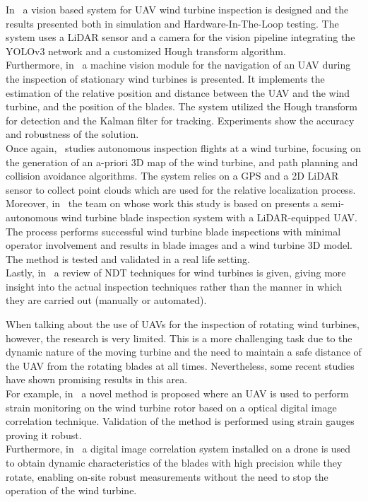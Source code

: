 In~\cite{weibin_gu} a vision based system for UAV wind turbine inspection is designed and the results presented both in simulation and Hardware-In-The-Loop testing. The system uses a LiDAR sensor and a camera for the vision pipeline integrating the YOLOv3 network and a customized Hough transform algorithm.\\
Furthermore, in~\cite{stokkeland2015} a machine vision module for the navigation of an UAV during the inspection of stationary wind turbines is presented. It implements the estimation of the relative position and distance between the UAV and the wind turbine, and the position of the blades. The system utilized the Hough transform for detection and the Kalman filter for tracking. Experiments show the accuracy and robustness of the solution.\\
Once again,~\cite{schafer2016} studies autonomous inspection flights at a wind turbine, focusing on the generation of an a-priori 3D map of the wind turbine, and path planning and collision avoidance algorithms. The system relies on a GPS and a 2D LiDAR sensor to collect point clouds which are used for the relative localization process.\\
Moreover, in~\cite{ref:Car2020} the team on whose work this study is based on presents a semi-autonomous wind turbine blade inspection system with a LiDAR-equipped UAV. The process performs successful wind turbine blade inspections with minimal operator involvement and results in blade images and a wind turbine 3D model. The method is tested and validated in a real life setting.\\
Lastly, in~\cite{drewry} a review of NDT techniques for wind turbines is given, giving more insight into the actual inspection techniques rather than the manner in which they are carried out (manually or automated).


When talking about the use of UAVs for the inspection of rotating wind turbines, however, the research is very limited. This is a more challenging task due to the dynamic nature of the moving turbine and the need to maintain a safe distance of the UAV from the rotating blades at all times. Nevertheless, some recent studies have shown promising results in this area.\\
For example, in~\cite{doi:10.1177/0309524X211027814} a novel method is proposed where an UAV is used to perform strain monitoring on the wind turbine rotor based on a optical digital image correlation technique. Validation of the method is performed using strain gauges proving it robust.\\
Furthermore, in~\cite{KHADKA2020106446} a digital image correlation system installed on a drone is used to obtain dynamic characteristics of the blades with high precision while they rotate, enabling on-site robust measurements without the need to stop the operation of the wind turbine.\\

